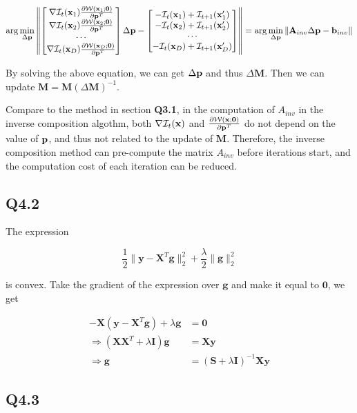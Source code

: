 \documentclass[11pt]{article}
\begin{document}
\begin{equation} \label{inverse_optimization_object}
    \arg\min_{\Delta \mathbf{p}}
    \left \|
    \begin{bmatrix}
        \nabla \mathcal{I}_{t}(\mathbf{x}_1) \frac{\partial\mathcal{W}(\mathbf{x}_1;\mathbf{0})}{\partial \mathbf{p}^T} \\
        \nabla \mathcal{I}_{t}(\mathbf{x}_2) \frac{\partial\mathcal{W}(\mathbf{x}_2;\mathbf{0})}{\partial \mathbf{p}^T} \\
        \cdots\\
        \nabla \mathcal{I}_{t}(\mathbf{x}_D) \frac{\partial\mathcal{W}(\mathbf{x}_D;\mathbf{0})}{\partial \mathbf{p}^T}
    \end{bmatrix}
    \Delta \mathbf{p} -
    \begin{bmatrix}
        - \mathcal{I}_t(\mathbf{x}_1) + \mathcal{I}_{t+1} (\mathbf{x}_1')\\
        - \mathcal{I}_t(\mathbf{x}_2) + \mathcal{I}_{t+1} (\mathbf{x}_2')\\
        \cdots\\
        - \mathcal{I}_t(\mathbf{x}_D) + \mathcal{I}_{t+1} (\mathbf{x}_D')\\
    \end{bmatrix}
    \right \|
    =
    \arg\min_{\Delta \mathbf{p}}
    \| \mathbf{A}_{inv}\Delta\mathbf{p} - \mathbf{b}_{inv} \|
\end{equation}

By solving the above equation, we can get $\Delta \mathbf{p}$ and thus $\Delta \mathbf{M}$. Then we can update $\mathbf{M}=\mathbf{M} (\Delta \mathbf{M})^{-1}$.

Compare to the method in section \textbf{Q3.1}, in the computation of $A_{inv}$ in the inverse composition algothm, both $\nabla \mathcal{I}_{t}(\mathbf{x})$ and $\frac{\partial\mathcal{W}(\mathbf{x};\mathbf{0})}{\partial \mathbf{p}^T}$ do not depend on the value of $\mathbf{p}$, and thus not related to the update of $\mathbf{M}$. Therefore, the inverse composition method can pre-compute the matrix $A_{inv}$ before iterations start, and  the computation cost of each iteration can be reduced.

\newpage
\subsection*{Q4.2}

The expression

\newcommand {\g} {\mathbf{g}}
\newcommand {\X} {\mathbf{X}}
\newcommand {\y} {\mathbf{y}}

\begin{equation}
    \frac{1}{2} \| \y-\X^T \g\|_2^2 + \frac{\lambda}{2} \|\g\|_2^2
\end{equation}

is convex. Take the gradient of the expression over $\g$ and make it equal to $\mathbf{0}$, we get

\begin{align}
    -\X(\y-\X^T\g) + \lambda \g &= \mathbf{0} \\
    \Rightarrow (\X\X^T+\lambda\mathbf{I})\g &= \X\y \\
    \Rightarrow \g &= (\mathbf{S}+\lambda\mathbf{I})^{-1} \X\y
\end{align}

\newpage
\subsection*{Q4.3}
\end{document}
